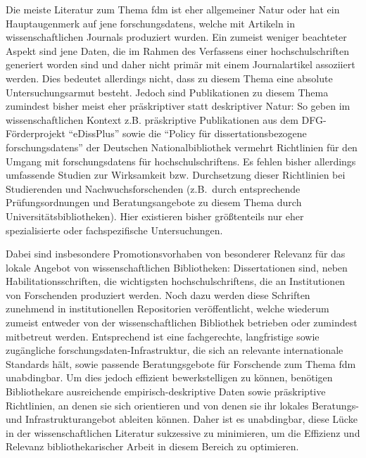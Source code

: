 Die meiste Literatur zum Thema \gls{fdm} ist eher allgemeiner Natur oder hat ein Hauptaugenmerk auf jene \glspl{forschungsdaten}, welche mit Artikeln in wissenschaftlichen Journals produziert wurden. Ein zumeist weniger beachteter Aspekt sind jene Daten, die im Rahmen des Verfassens einer \gls{hochschulschriften} generiert worden sind und daher nicht primär mit einem Journalartikel assoziiert werden.
Dies bedeutet allerdings nicht, dass zu diesem Thema eine absolute Untersuchungsarmut besteht.
Jedoch sind Publikationen zu diesem Thema zumindest bisher meist eher präskriptiver statt deskriptiver Natur:
So geben im wissenschaftlichen Kontext z.B. präskriptive Publikationen aus dem DFG-Förderprojekt \enquote{eDissPlus} \autocite{Weisbrod2017eDissPlus, KleinebergKaden2018, Weisbrod2018} sowie die \enquote{Policy für dissertationsbezogene \glspl{forschungsdaten}} der Deutschen Nationalbibliothek \autocite{dnb2017} vermehrt Richtlinien für den Umgang mit \glspl{forschungsdaten} für \glspl{hochschulschriften}.
Es fehlen bisher allerdings umfassende Studien zur Wirksamkeit bzw.
Durchsetzung dieser Richtlinien bei Studierenden und Nachwuchsforschenden (z.B.~durch entsprechende Prüfungsordnungen und Beratungsangebote zu diesem Thema durch Universitätsbibliotheken).
Hier existieren bisher größtenteils nur eher spezialisierte oder fachspezifische Untersuchungen.

Dabei sind insbesondere Promotionsvorhaben von besonderer Relevanz für das lokale Angebot von wissenschaftlichen Bibliotheken:
Dissertationen sind, neben Habilitationsschriften, die wichtigsten \glspl{hochschulschriften}, die an Institutionen von Forschenden produziert werden.
Noch dazu werden diese Schriften zunehmend in institutionellen Repositorien veröffentlicht, welche wiederum zumeist entweder von der wissenschaftlichen Bibliothek betrieben oder zumindest mitbetreut werden.
Entsprechend ist eine fachgerechte, langfristige sowie zugängliche \gls{forschungsdaten}-Infrastruktur, die sich an relevante internationale Standards hält, sowie passende Beratungsgebote für Forschende zum Thema \gls{fdm} unabdingbar.
Um dies jedoch effizient bewerkstelligen zu können, benötigen Bibliothekare ausreichende empirisch-deskriptive Daten sowie präskriptive Richtlinien, an denen sie sich orientieren und von denen sie ihr lokales Beratungs- und Infrastrukturangebot ableiten können.
Daher ist es unabdingbar, diese Lücke in der wissenschaftlichen Literatur sukzessive zu minimieren, um die Effizienz und Relevanz bibliothekarischer Arbeit in diesem Bereich zu optimieren.


